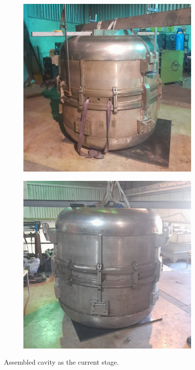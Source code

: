 \documentclass{book}
\begin{document}
\begin{figure}
    \captionsetup[subfigure]{justification=centering}
    \captionsetup{justification=centering}
    \centering
    \begin{subfigure}{.5\textwidth}
      \centering
      \includegraphics[width=.96\linewidth]{../../../figures/manif/assembled/rhodo_assembled_2_cropped.jpeg}
    \end{subfigure}%
    \centering
    \begin{subfigure}{.5\textwidth}
      \centering
      \includegraphics[width=.96\linewidth]{../../../figures/manif/assembled/rhodo_assembled_1_cropped.jpeg}
    \end{subfigure}
    \caption{Assembled cavity as the current stage.}
    \label{fig:manif_assembled}
\end{figure}



\end{document}
